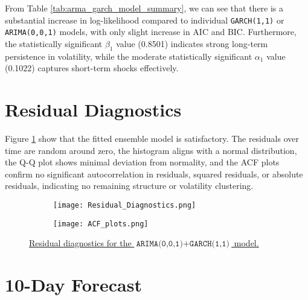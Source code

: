 \documentclass{article}
\newcommand{\1}{\mathbbm{1}}
\theoremstyle{definition}
\begin{document}
From Table \ref{tab:arma_garch_model_summary}, we can see that there is a substantial increase in log-likelihood compared to individual \texttt{GARCH(1,1)} or \texttt{ARIMA(0,0,1)} models, with only slight increase in AIC and BIC. Furthermore, the statistically significant $\beta_1$ value (0.8501) indicates strong long-term persistence in volatility, while the moderate statistically significant $\alpha_1$ value (0.1022) captures short-term shocks effectively.








\section{Residual Diagnostics}

Figure \ref{fig:residual_diagnostics} show that the fitted ensemble model is satisfactory. The residuals over time are random around zero, the histogram aligns with a normal distribution, the Q-Q plot shows minimal deviation from normality, and the ACF plots confirm no significant autocorrelation in residuals, squared residuals, or absolute residuals, indicating no remaining structure or volatility clustering.



\begin{figure}[H]
\centering
\begin{subfigure}{\textwidth}
    \centering
    \texttt{[image: Residual\_Diagnostics.png]}
\end{subfigure}

\begin{subfigure}{\textwidth}
    \centering
    \texttt{[image: ACF\_plots.png]}
\end{subfigure}

\caption{\small{\href{https://github.com/Stochastic1017/Walmart-Stock-Forecasting/blob/main/R/Plot_Residual_Diagnostics.R}{Residual diagnostics for the $\texttt{ARIMA(0,0,1)} + \texttt{GARCH(1,1)}$ model.}}}
\label{fig:residual_diagnostics}
\end{figure}










\section{10-Day Forecast}
\end{document}
